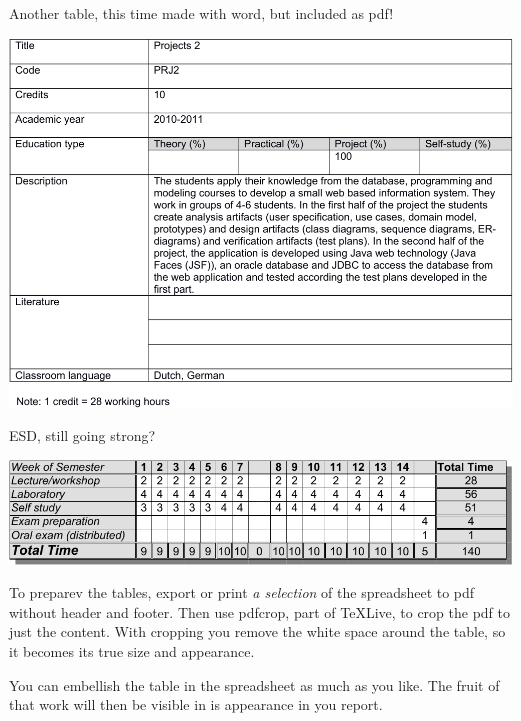 \begin{table}
  \caption{Another table, this time made with word, but included as pdf!}
\includegraphics{tables/md_prj2-crop.pdf}   
\end{table}

\begin{table}
  \caption{ESD, still going strong?}
\includegraphics{tables/timetable-crop.pdf}
\end{table}


To preparev the tables, export or print \textit{a selection} of the spreadsheet to pdf without header and footer.
Then use pdfcrop, part of TeXLive, to crop the pdf to just the content. With cropping you remove the white space around the table, so it becomes its true size and appearance.

You can embellish the table in the spreadsheet as much as you like. The fruit of that work will then be visible in is appearance in you report.

